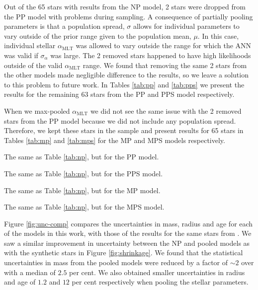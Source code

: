 \documentclass[a4paper,fleqn,usenatbib]{mnras}
\newcommand{\mlt}{\ensuremath{{\alpha_\mathrm{MLT}}}}
\begin{document}
Out of the 65 stars with results from the NP model, 2 stars were dropped from the PP model with problems during sampling. A consequence of partially pooling parameters is that a population spread, $\sigma$ allows for individual parameters to vary outside of the prior range given to the population mean, $\mu$. In this case, individual stellar $\mlt$ was allowed to vary outside the range for which the ANN was valid if $\sigma_\alpha$ was large. The 2 removed stars happened to have high likelihoods outside of the valid $\mlt$ range. We found that removing the same 2 stars from the other models made negligible difference to the results, so we leave a solution to this problem to future work. In Tables \ref{tab:pp} and \ref{tab:pps} we present the results for the remaining 63 stars from the PP and PPS model respectively. 

When we max-pooled $\mlt$ we did not see the same issue with the 2 removed stars from the PP model because we did not include any population spread. Therefore, we kept these stars in the sample and present results for 65 stars in Tables \ref{tab:mp} and \ref{tab:mps} for the MP and MPS models respectively.

\begin{table}
	\centering
	\caption{The same as Table \ref{tab:np}, but for the PP model.}
	\label{tab:pp}
	
\end{table}

\begin{table}
	\centering
	\caption{The same as Table \ref{tab:np}, but for the PPS model.}
	\label{tab:pps}
	
\end{table}

\begin{table}
	\centering
	\caption{The same as Table \ref{tab:np}, but for the MP model.}
	\label{tab:mp}
	
\end{table}

\begin{table}
	\centering
	\caption{The same as Table \ref{tab:np}, but for the MPS model.}
	\label{tab:mps}
	
\end{table}

Figure \ref{fig:unc-comp} compares the uncertainties in mass, radius and age for each of the models in this work, with those of the results for the same stars from . We saw a similar improvement in uncertainty between the NP and pooled models as with the synthetic stars in Figure \ref{fig:shrinkage}. We found that the statistical uncertainties in mass from the pooled models were reduced by a factor of $\sim 2$ over  with a median of $2.5$ per cent. We also obtained smaller uncertainties in radius and age of $1.2$ and $12$ per cent respectively when pooling the stellar parameters.
\end{document}
